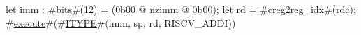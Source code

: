 let imm : #\hyperref[sailRISCVzbits]{bits}#(12) = (0b00 @ nzimm @ 0b00);
let rd = #\hyperref[sailRISCVzcreg2regzyidx]{creg2reg\_idx}#(rdc);
#\hyperref[sailRISCVzexecute]{execute}#(#\hyperref[sailRISCVzITYPE]{ITYPE}#(imm, sp, rd, RISCV_ADDI))
